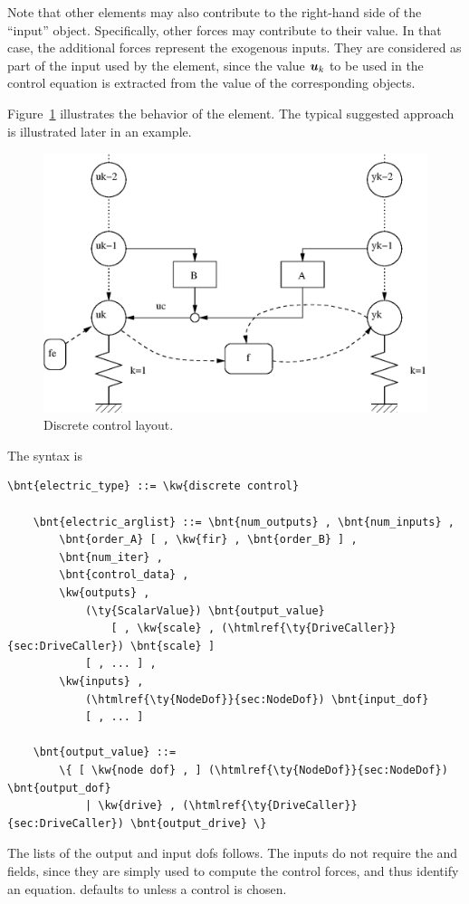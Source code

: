 Note that other elements may also contribute to the right-hand side
of the ``input''  object.
Specifically, other  forces may contribute to their value.
In that case, the additional forces represent the exogenous inputs.
They are considered as part of the input used by the 
element, since the value $\boldsymbol{u}_k$ to be used in the control equation
is extracted from the value of the corresponding  objects.

Figure~\ref{fig:discctrl} illustrates the behavior of the element.
The typical suggested approach is illustrated later in an example.
\begin{figure}
\centering
{}
\includegraphics[width=.7\textwidth]{discctrl}
\caption{Discrete control layout.}
\label{fig:discctrl}
\end{figure}

The syntax is
\begin{Verbatim}[commandchars=\\\{\}]
    \bnt{electric_type} ::= \kw{discrete control}

    \bnt{electric_arglist} ::= \bnt{num_outputs} , \bnt{num_inputs} ,
        \bnt{order_A} [ , \kw{fir} , \bnt{order_B} ] ,
        \bnt{num_iter} ,
        \bnt{control_data} , 
        \kw{outputs} ,
            (\ty{ScalarValue}) \bnt{output_value}
                [ , \kw{scale} , (\htmlref{\ty{DriveCaller}}{sec:DriveCaller}) \bnt{scale} ]
            [ , ... ] ,
        \kw{inputs} ,
            (\htmlref{\ty{NodeDof}}{sec:NodeDof}) \bnt{input_dof}
            [ , ... ]

    \bnt{output_value} ::=
        \{ [ \kw{node dof} , ] (\htmlref{\ty{NodeDof}}{sec:NodeDof}) \bnt{output_dof}
            | \kw{drive} , (\htmlref{\ty{DriveCaller}}{sec:DriveCaller}) \bnt{output_drive} \}
\end{Verbatim}
The lists of the output and input dofs follows. The inputs
do not require the  and  fields,
since they are simply used to compute the control forces,
and thus identify an equation.
 defaults to  unless a  control is chosen.

